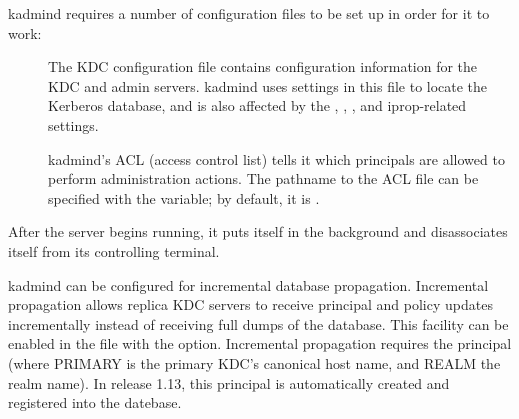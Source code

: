 \documentclass[letterpaper,10pt,english]{sphinxmanual}
\begin{document}
kadmind requires a number of configuration files to be set up in order
for it to work:
\begin{description}
\item[{{\hyperref[\detokenize{admin/conf_files/kdc_conf:kdc-conf-5}]{}}}] \leavevmode
The KDC configuration file contains configuration information for
the KDC and admin servers.  kadmind uses settings in this file to
locate the Kerberos database, and is also affected by the
, , , and iprop-related
settings.

\item[{{\hyperref[\detokenize{admin/conf_files/kadm5_acl:kadm5-acl-5}]{}}}] \leavevmode
kadmind’s ACL (access control list) tells it which principals are
allowed to perform administration actions.  The pathname to the
ACL file can be specified with the  {\hyperref[\detokenize{admin/conf_files/kdc_conf:kdc-conf-5}]{}}
variable; by default, it is {\hyperref[\detokenize{mitK5defaults:paths}]{}}.

\end{description}

After the server begins running, it puts itself in the background and
disassociates itself from its controlling terminal.

kadmind can be configured for incremental database propagation.
Incremental propagation allows replica KDC servers to receive
principal and policy updates incrementally instead of receiving full
dumps of the database.  This facility can be enabled in the
{\hyperref[\detokenize{admin/conf_files/kdc_conf:kdc-conf-5}]{}} file with the  option.  Incremental
propagation requires the principal  (where
PRIMARY is the primary KDC’s canonical host name, and REALM the realm
name).  In release 1.13, this principal is automatically created and
registered into the datebase.
\end{document}
